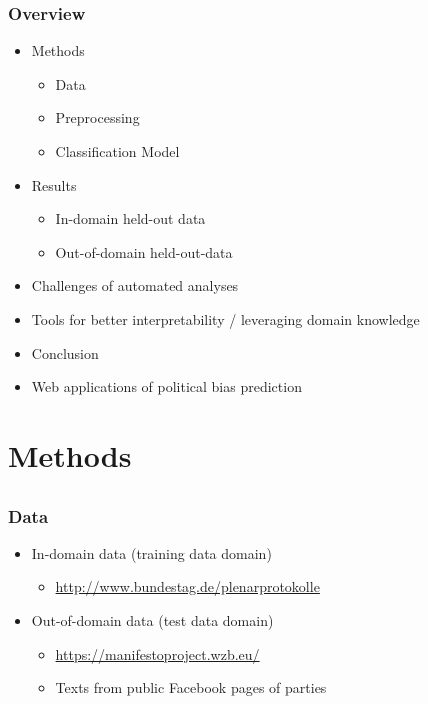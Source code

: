 \documentclass[]{beamer}
\begin{document}
\begin{frame}\frametitle{Overview}
\small
\begin{itemize}
\item Methods 
\begin{itemize}
\item Data
\item Preprocessing
\item Classification Model
\end{itemize}
\item Results
\begin{itemize}
\item In-domain held-out data
\item Out-of-domain held-out-data
\end{itemize}
\item Challenges of automated analyses
\item Tools for better interpretability / leveraging domain knowledge
\item Conclusion
\item Web applications of political bias prediction
\end{itemize}
\end{frame}

\section{Methods}
\subsection{}

\begin{frame}\frametitle{Data}
\begin{itemize}
\item In-domain data (training data domain)
\begin{itemize}
\item \url{http://www.bundestag.de/plenarprotokolle}
\end{itemize}
\vspace{1em}
\item Out-of-domain data (test data domain)
\begin{itemize}
\item \url{https://manifestoproject.wzb.eu/}
\item Texts from public Facebook pages of parties
\end{itemize}
\end{itemize}
\end{frame}
\end{document}
